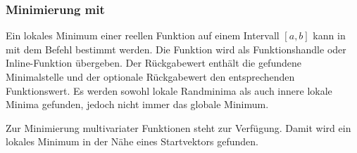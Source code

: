 \pagebreak

\subsubsection{%
    Minimierung mit \matlab{}%
}

Ein lokales Minimum einer reellen Funktion auf einem Intervall $[a, b]$ kann
in \matlab{} mit dem Befehl  bestimmt
werden.
Die Funktion  wird als Funktionshandle oder Inline-Funktion übergeben.
Der Rückgabewert  enthält die gefundene Minimalstelle und der optionale
Rückgabewert  den entsprechenden Funktionswert.
Es werden sowohl lokale Randminima als auch innere lokale Minima gefunden,
jedoch nicht immer das globale Minimum.

Zur Minimierung multivariater Funktionen steht
 zur Verfügung.
Damit wird ein lokales Minimum in der Nähe eines Startvektors 
gefunden.

\pagebreak
